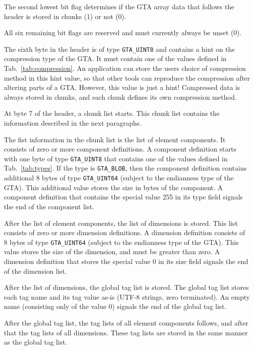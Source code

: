 \documentclass[a4paper,11pt]{article}
\newcommand{\code}[1]{\texttt{#1}}
\begin{document}
The second lowest bit flag determines if the GTA array data that follows the header 
is stored in chunks (1) or not (0).

All six remaining bit flags are reserved and must currently always be unset (0).

The sixth byte in the header is of type \code{GTA\_UINT8} and contains a hint on
the compression type of the GTA. It must contain one of the values defined in
Tab.~\ref{tab:compression}.  An application can store the users choice of
compression method in this hint value, so that other tools can reproduce the
compression after altering parts of a GTA. However, this value is just a hint!
Compressed data is always stored in chunks, and each chunk defines its own
compression method.

At byte 7 of the header, a chunk list starts. This chunk list contains the
information described in the next paragraphs.

The fist information in the chunk list is the list of element components. It
consists of zero or more component definitions. A component definition starts
with one byte of type \code{GTA\_UINT8} that contains one of the values
defined in Tab.~\ref{tab:types}. If the type is \code{GTA\_BLOB}, then the
component definition contains additional 8 bytes of type \code{GTA\_UINT64}
(subject to the endianness type of the GTA). This additional value stores the
size in bytes of the component. A component definition that contains the
special value 255 in its type field signals the end of the component list.

After the list of element components, the list of dimensions is stored.  This
list consists of zero or more dimension definitions. A dimension definition
consists of 8 bytes of type \code{GTA\_UINT64} (subject to the endianness type
of the GTA). This value stores the size of the dimension, and must be greater
than zero. A dimension definition that stores the special value 0 in its size
field signals the end of the dimension list.

After the list of dimensions, the global tag list is stored.  The global tag
list stores each tag name and its tag value as-is (UTF-8 strings, zero
terminated). An empty name (consisting only of the value 0) signals
the end of the global tag list.

After the global tag list, the tag lists of all element components follows, and
after that the tag lists of all dimensions. These tag lists are stored in the
same manner as the global tag list.
\end{document}
